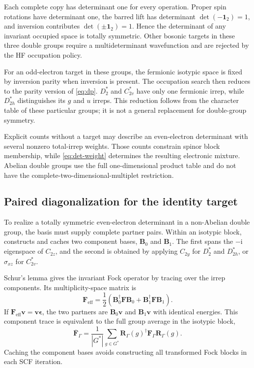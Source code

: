 \documentclass[aip,jcp,preprint,nobibnotes,nofootinbib]{revtex4-1}
\newcommand{\bvec}[1]{\mathbf{#1}}
\newcommand{\Id}{\bvec{1}}
\newcommand{\code}[1]{\texttt{\detokenize{#1}}}
\begin{document}
Each complete copy has determinant one for every operation. Proper spin
rotations have determinant one, the barred lift has determinant
$\det(-\Id_2)=1$, and inversion contributes $\det(\pm\Id_2)=1$. Hence the
determinant of any invariant occupied space is totally symmetric. Other
bosonic targets in these three double groups require a multideterminant
wavefunction and are rejected by the HF occupation policy.

For an odd-electron target in these groups, the fermionic isotypic space is
fixed by inversion parity when inversion is present. The occupation search
then reduces to the parity version of \cref{eq:dp}. $D_2^*$ and $C_{2v}^*$
have only one fermionic irrep, while $D_{2h}^*$ distinguishes its $g$ and $u$
irreps. This reduction follows from the character table of these particular
groups; it is not a general replacement for double-group symmetry.

Explicit counts without a target may describe an even-electron determinant
with several nonzero total-irrep weights. Those counts constrain spinor block
membership, while \cref{eq:det-weight} determines the resulting electronic
mixture. Abelian double groups use the full one-dimensional product table and
do not have the complete-two-dimensional-multiplet restriction.

\subsection{Paired diagonalization for the identity target}
\label{sec:paired}

To realize a totally symmetric even-electron determinant in a non-Abelian
double group, the basis must supply complete partner pairs. Within an
isotypic block, \code{DoubleGroupBasis} constructs and caches two component
bases, $\bvec{B}_0$ and $\bvec{B}_1$. The first spans the $-\mathrm{i}$
eigenspace of $C_{2z}$, and the second is obtained by applying $C_{2y}$ for
$D_2^*$ and $D_{2h}^*$, or $\sigma_{xz}$ for $C_{2v}^*$.

Schur's lemma gives the invariant Fock operator by tracing over the irrep
components. Its multiplicity-space matrix is
\begin{equation}
 \bvec{F}_{\mathrm{eff}}=\frac12\left(
     \bvec{B}_0^\dagger\bvec{F}\bvec{B}_0
    +\bvec{B}_1^\dagger\bvec{F}\bvec{B}_1\right).
 \label{eq:schur}
\end{equation}
If $\bvec{F}_{\mathrm{eff}}\bvec{v}=\bvec{v}\bvec{\epsilon}$, the two
partners are $\bvec{B}_0\bvec{v}$ and $\bvec{B}_1\bvec{v}$ with identical
energies. This component trace is equivalent to the full group average in
the isotypic block,
\begin{equation}
 \overline{\bvec{F}}_\Gamma
 =\frac{1}{|G^*|}\sum_{g\in G^*}
    \bvec{R}_\Gamma(g)^\dagger\bvec{F}_\Gamma\bvec{R}_\Gamma(g).
 \label{eq:group-average}
\end{equation}
Caching the component bases avoids constructing all transformed Fock blocks
in each SCF iteration.
\end{document}
